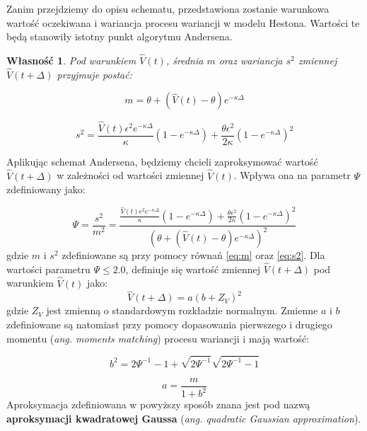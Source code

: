 \documentclass{pracamgr}
\newtheorem{prop}{Własność}
\begin{document}
Zanim przejdziemy do opisu schematu, przedstawiona zostanie warunkowa wartość oczekiwana i wariancja 
procesu wariancji w modelu Hestona. Wartości te będą stanowiły istotny punkt algorytmu Andersena.
\begin{prop}
Pod warunkiem $\hat{V}(t)$, średnia $m$ oraz wariancja $s^2$ zmiennej $\hat{V}(t + \Delta)$ przyjmuje 
postać:

\begin{equation}
  \label{eq:m}
  m= \theta + (\hat{V}(t) - \theta) e^{-\kappa \Delta}
\end{equation}

\begin{equation}
  \label{eq:s2}
  s^2 = \frac{\hat{V}(t)\epsilon^2 e^{-\kappa \Delta}}{\kappa} (1 - e^{-\kappa \Delta}) + \frac{\theta \epsilon^2}{2 \kappa}(1 - e^{-\kappa \Delta})^2
\end{equation}
\end{prop}
 

Aplikując schemat Andersena, będziemy chcieli zaproksymować wartość  $\hat{V}(t + \Delta)$ w 
zależności od wartości zmiennej $\hat{V}(t)$. Wpływa ona na parametr $\Psi$ zdefiniowany jako:


\begin{equation}
 \label{eq:ksi}
 \Psi = \frac{s^2}{m^2} = \frac{\frac{\hat{V}(t)\epsilon^2 e^{-\kappa \Delta}}{\kappa} (1 - e^{-\kappa \Delta}) + \frac{\theta \epsilon^2}{2 \kappa}(1 - e^{-\kappa \Delta})^2}{(\theta + (\hat{V}(t) - \theta) e^{-\kappa \Delta})^2} 
\end{equation}
gdzie $m$ i $s^2$ zdefiniowane są przy pomocy równań \ref{eq:m} oraz \ref{eq:s2}.
Dla wartości parametru $\Psi \leq 2.0$, definiuje się wartość zmiennej $\hat{V}(t + \Delta)$ pod 
warunkiem  $\hat{V}(t)$ jako:
\begin{equation}
 \label{eq:vtbig}
\hat{V}(t + \Delta)  = a (b + Z_V)^2
\end{equation}
gdzie $Z_V$ jest zmienną o standardowym rozkładzie normalnym. Zmienne $a$ i $b$ zdefiniowane są 
natomiast przy pomocy dopasowania pierwszego i drugiego momentu (\textit{ang. moments matching}) 
procesu wariancji i mają wartość:


\begin{equation}
\label{eq:b}
b^2 = 2 \Psi^{-1} - 1 + \sqrt{2 \Psi^{-1}} \sqrt{2 \Psi^{-1} - 1}
\end{equation}

\begin{equation}
\label{eq:a}
a = \frac{m}{1 + b^2}
\end{equation}
Aproksymacja zdefiniowana w powyższy sposób znana jest pod nazwą 
\textbf{aproksymacji kwadratowej Gaussa} (\textit{ang. quadratic Gaussian approximation}).
\end{document}
